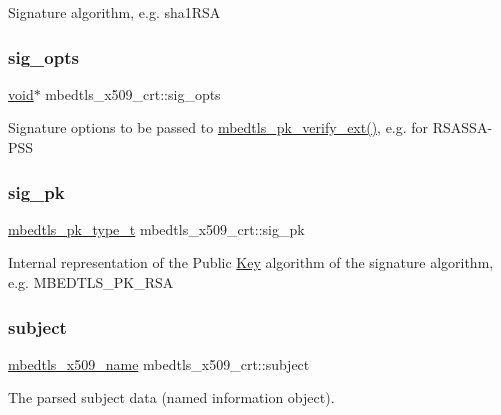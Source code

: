 Signature algorithm, e.\+g. sha1\+R\+SA \mbox{\label{structmbedtls__x509__crt_a67c497ed6535050997c014507a866e9e}} 
\subsubsection{\texorpdfstring{sig\+\_\+opts}{sig\_opts}}
{\footnotesize\ttfamily \hyperlink{interfacevoid}{void}$\ast$ mbedtls\+\_\+x509\+\_\+crt\+::sig\+\_\+opts}

Signature options to be passed to \hyperlink{pk_8h_a81f0c5e40b839f5eca676c2c2752036f}{mbedtls\+\_\+pk\+\_\+verify\+\_\+ext()}, e.\+g. for R\+S\+A\+S\+S\+A-\/\+P\+SS \mbox{\label{structmbedtls__x509__crt_a65d5d20352a08c77e173808fde1f8660}} 
\subsubsection{\texorpdfstring{sig\+\_\+pk}{sig\_pk}}
{\footnotesize\ttfamily \hyperlink{pk_8h_a3fe41eff5605ae727eb9d28dad297020}{mbedtls\+\_\+pk\+\_\+type\+\_\+t} mbedtls\+\_\+x509\+\_\+crt\+::sig\+\_\+pk}

Internal representation of the Public \hyperlink{struct_key}{Key} algorithm of the signature algorithm, e.\+g. M\+B\+E\+D\+T\+L\+S\+\_\+\+P\+K\+\_\+\+R\+SA \mbox{\label{structmbedtls__x509__crt_a773e92423092ab65e5e50031bd9663a5}} 
\subsubsection{\texorpdfstring{subject}{subject}}
{\footnotesize\ttfamily \hyperlink{group__x509__module_ga2272228c7776102328df31623af3168c}{mbedtls\+\_\+x509\+\_\+name} mbedtls\+\_\+x509\+\_\+crt\+::subject}

The parsed subject data (named information object). \mbox{\label{structmbedtls__x509__crt_a1f148e8fb52e03e2604e716386a07df4}} 
